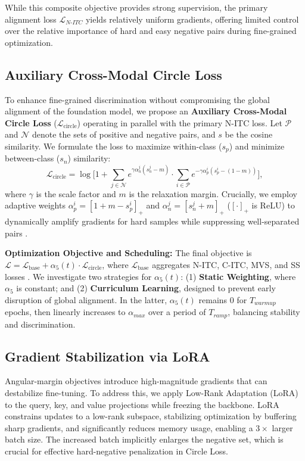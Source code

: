 \documentclass{article}
\begin{document}
While this composite objective provides strong supervision, the primary alignment loss $\mathcal{L}_{N\text{-}ITC}$ yields relatively uniform gradients, offering limited control over the relative importance of hard and easy negative pairs during fine-grained optimization.

\subsection{Auxiliary Cross-Modal Circle Loss}
To enhance fine-grained discrimination without compromising the global alignment of the foundation model, we propose an \textbf{Auxiliary Cross-Modal Circle Loss} ($\mathcal{L}_{\text{circle}}$) operating in parallel with the primary N-ITC loss. Let $\mathcal{P}$ and $\mathcal{N}$ denote the sets of positive and negative pairs, and $s$ be the cosine similarity. We formulate the loss to maximize within-class ($s_p$) and minimize between-class ($s_n$) similarity:
\begin{equation}
\mathcal{L}_{\text{circle}} = \log \Bigg[ 1 + \sum_{j \in \mathcal{N}} e^{\gamma \alpha_n^j (s_n^j - m)} \cdot \sum_{i \in \mathcal{P}} e^{-\gamma \alpha_p^i (s_p^i - (1-m))} \Bigg],
\end{equation}
where $\gamma$ is the scale factor and $m$ is the relaxation margin. Crucially, we employ adaptive weights $\alpha_p^i = [1 + m - s_p^i]_+$ and $\alpha_n^j = [s_n^j + m]_+$ ($[\cdot]_+$ is ReLU) to dynamically amplify gradients for hard samples while suppressing well-separated pairs \cite{sun2020circle}.

\textbf{Optimization Objective and Scheduling:} The final objective is $\mathcal{L} = \mathcal{L}_{\text{base}} + \alpha_5(t) \cdot \mathcal{L}_{\text{circle}}$, where $\mathcal{L}_{\text{base}}$ aggregates N-ITC, C-ITC, MVS, and SS losses \cite{tran2025multilingual}. We investigate two strategies for $\alpha_5(t)$: (1) \textbf{Static Weighting}, where $\alpha_5$ is constant; and (2) \textbf{Curriculum Learning}, designed to prevent early disruption of global alignment. In the latter, $\alpha_5(t)$ remains 0 for $T_{warmup}$ epochs, then linearly increases to $\alpha_{max}$ over a period of $T_{ramp}$, balancing stability and discrimination.

\subsection{Gradient Stabilization via LoRA}
Angular-margin objectives introduce high-magnitude gradients that can destabilize fine-tuning. To address this, we apply Low-Rank Adaptation (LoRA) to the query, key, and value projections while freezing the backbone. LoRA constrains updates to a low-rank subspace, stabilizing optimization by buffering sharp gradients, and significantly reduces memory usage, enabling a $3\times$ larger batch size. The increased batch implicitly enlarges the negative set, which is crucial for effective hard-negative penalization in Circle Loss. 
\end{document}
